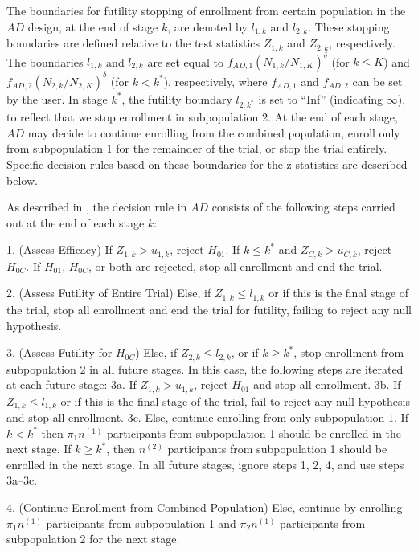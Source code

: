 \documentclass[article]{jss}
\begin{document}
The boundaries for futility stopping of enrollment from certain population in the $AD$ design, at the end of stage $k$, are denoted by $l_{1,k}$ and $l_{2,k}$. These stopping boundaries are defined relative to the test statistics $Z_{1,k}$ and $Z_{2,k}$, respectively. The boundaries $l_{1,k}$ and $l_{2,k}$ are set equal to $f_{AD,1}(N_{1,k}/N_{1,K})^{\delta}$ (for $k\leq K$) and $f_{AD,2}(N_{2,k}/N_{2,K})^{\delta}$ (for $k < k^*$), respectively, where $f_{AD,1}$ and $f_{AD,2}$ can be set by the user.  In stage $k^*$, the futility boundary $l_{2,k^*}$ is set to ``Inf'' (indicating $\infty$), to reflect that we stop enrollment in subpopulation 2. At the end of each stage, $AD$ may decide to continue enrolling from the combined population, enroll only from subpopulation 1 for the remainder of the trial, or stop the trial entirely.  Specific decision rules based on these boundaries for the z-statistics are described below. 

As described in \citep{Rosenblum2013AdaptMISTIE}, the decision rule in $AD$ consists of the following steps carried out at the end of each stage $k$:


\begin{description}
\item 1. (Assess Efficacy) 
 If $Z_{1,k}>u_{1,k}$, reject $H_{01}$.
   If $k\leq k^*$ and  $Z_{C,k} > u_{C,k}$, reject $H_{0C}$. 
 If $H_{01}$, $H_{0C}$, or both  are rejected, stop all enrollment and end the trial.
\item 2. (Assess Futility of Entire Trial) Else, if $Z_{1,k} ≤ l_{1,k}$ or if this is the final stage of the trial, stop all enrollment and end the trial for futility, failing to reject  any null hypothesis.
\item 3. (Assess Futility for $H_{0C}$) Else, if $Z_{2,k} ≤ l_{2,k}$, or if $k\geq k^*$, stop enrollment from subpopulation $2$ in all future stages. In this case, the following steps are iterated at each future stage:
	\subitem  3a. If $Z_{1,k} > u_{1,k}$, reject $H_{01}$ and stop all enrollment.
	\subitem  3b. If $Z_{1,k} ≤ l_{1,k}$ or if this is the final stage of the trial, fail to reject any null hypothesis  and stop all enrollment.
	\subitem  3c. Else, continue enrolling from only subpopulation $1$. If $k < k^*$ then $π_1n^{(1)}$ participants from subpopulation 1 should be enrolled in the next stage. If $k \geq k^*$, then $n^{(2)}$ participants from subpopulation 1 should be enrolled in the next stage. In all future stages, ignore steps 1, 2, 4, and use steps 3a--3c.
\item  4. (Continue Enrollment from Combined Population) Else, continue by enrolling $\pi_1 n^{(1)}$ participants from subpopulation 1 and $\pi_2 n^{(1)}$ participants from subpopulation 2 for the next stage.
\end{description}
\end{document}
